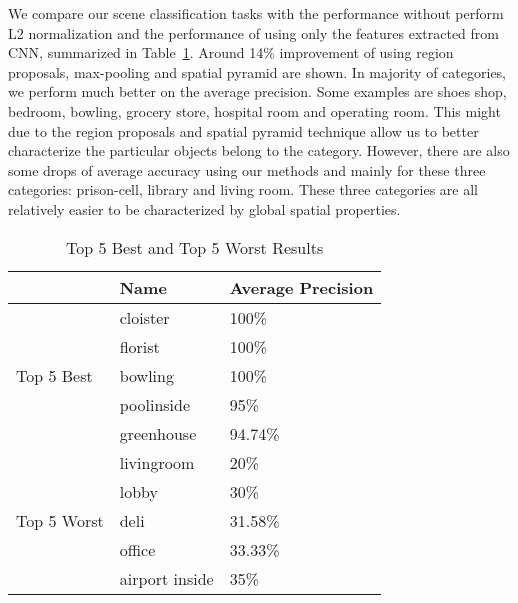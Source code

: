 We compare our scene classification tasks with the performance without perform
L2 normalization and the performance of using only the features extracted from
CNN, summarized in Table~\ref{tab:overall}. Around 14\% improvement of using
region proposals, max-pooling and spatial pyramid are shown. In majority of
categories, we perform much better on the average precision. Some examples
are shoes shop, bedroom, bowling, grocery store, hospital room and operating
room. This might due to the region proposals and spatial pyramid technique
allow us to better characterize the particular objects belong to the category.
However, there are also some drops of average accuracy using our methods and
mainly for these three categories: prison-cell, library and living room. These
three categories are all relatively easier to be characterized by global
spatial properties.

\begin{table}[ht]
        \caption{Top 5 Best and Top 5 Worst Results}
        \centering
        \begin{tabular}{l l l}
        \hline \hline
        & Name           & Average Precision \\ \hline
        \multirow{5}{*}{Top 5 Best}
        & cloister       & 100\% \\
        & florist        & 100\% \\
        & bowling        & 100\% \\
        & poolinside     & 95\% \\
        & greenhouse     & 94.74\% \\
        \hline
        \multirow{5}{*}{Top 5 Worst}
        & livingroom     & 20\% \\
        & lobby          & 30\% \\
        & deli           & 31.58\% \\
        & office         & 33.33\% \\
        & airport inside & 35\% \\
        \hline
        \end{tabular}
        \label{tab:overall}
\end{table}


